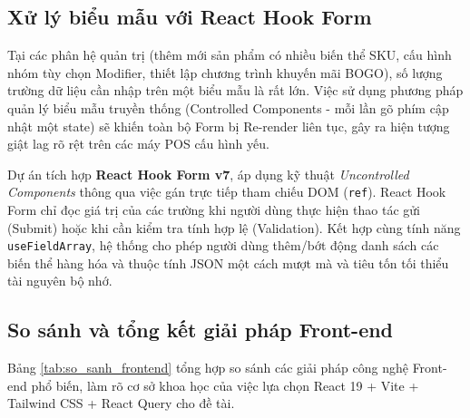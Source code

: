 \subsection{Xử lý biểu mẫu với React Hook Form}
Tại các phân hệ quản trị (thêm mới sản phẩm có nhiều biến thể SKU, cấu hình nhóm tùy chọn Modifier, thiết lập chương trình khuyến mãi BOGO), số lượng trường dữ liệu cần nhập trên một biểu mẫu là rất lớn. Việc sử dụng phương pháp quản lý biểu mẫu truyền thống (Controlled Components - mỗi lần gõ phím cập nhật một state) sẽ khiến toàn bộ Form bị Re-render liên tục, gây ra hiện tượng giật lag rõ rệt trên các máy POS cấu hình yếu.

Dự án tích hợp \textbf{React Hook Form v7}, áp dụng kỹ thuật \textit{Uncontrolled Components} thông qua việc gán trực tiếp tham chiếu DOM (\texttt{ref}). React Hook Form chỉ đọc giá trị của các trường khi người dùng thực hiện thao tác gửi (Submit) hoặc khi cần kiểm tra tính hợp lệ (Validation). Kết hợp cùng tính năng \texttt{useFieldArray}, hệ thống cho phép người dùng thêm/bớt động danh sách các biến thể hàng hóa và thuộc tính JSON một cách mượt mà và tiêu tốn tối thiểu tài nguyên bộ nhớ.

\subsection{So sánh và tổng kết giải pháp Front-end}
Bảng \ref{tab:so_sanh_frontend} tổng hợp so sánh các giải pháp công nghệ Front-end phổ biến, làm rõ cơ sở khoa học của việc lựa chọn React 19 + Vite + Tailwind CSS + React Query cho đề tài.

